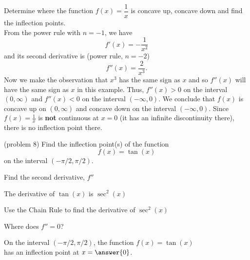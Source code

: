 \documentclass[handout]{ximera}
\begin{document}
\begin{example}[example 8]
Determine where the function $f(x) = \dfrac{1}{x}$ is concave up, concave down and 
find the inflection points.\\
From the power rule with $n = -1$, we have 
\[
f'(x) = -\frac{1}{x^2}
\]
and its second derivative is (power rule, $n = -2$)
\[
f''(x) = \frac{2}{x^3}.
\]
Now we make the observation that $x^3$ has the same sign as $x$ and so $f''(x)$ will have 
the same sign as $x$
in this example. Thus, $f''(x) > 0$ on the interval $(0, \infty)$ and $f''(x) < 0$ on the 
interval $(-\infty,0).$
We conclude that $f(x)$ is concave up on $(0, \infty)$ and concave down on the 
interval $(-\infty, 0).$ 
Since $f(x) = \frac{1}{x}$ is \textbf{not} continuous at $x=0$ (it has an infinite 
discontinuity there), 
there is no inflection point there.  

\begin{image}
\end{image}
\end{example}


\begin{problem}(problem 8)
  Find the inflection point(s) of the function
  \[
     f(x) = \tan(x)
  \]
	on the interval $(-\pi/2, \pi/2)$.\\
  
    \begin{hint}
      Find the second derivative, $f''$
    \end{hint}
    \begin{hint}
      The derivative of $\tan(x)$ is $\sec^2(x)$
    \end{hint}
		\begin{hint}
      Use the Chain Rule to find the derivative of $\sec^2(x)$
    \end{hint}
		\begin{hint}
      Where does $f'' = 0$?
    \end{hint}
	On the interval $(-\pi/2, \pi/2)$, the function $f(x) = \tan(x)$ \\
	has an inflection point at $x =\answer{0}$.
 
\end{problem}
\end{document}
